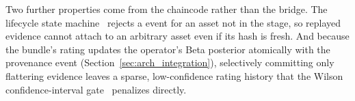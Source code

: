Two further properties come from the chaincode rather than the bridge.
The lifecycle state machine~\cite{anonymous2026unified} rejects a
 event for an asset not in the
 stage, so replayed evidence cannot attach to
an arbitrary asset even if its hash is fresh.  And because the bundle's
rating updates the operator's Beta posterior atomically with the
provenance event (Section~\ref{sec:arch_integration}), selectively
committing only flattering evidence leaves a sparse, low-confidence
rating history that the Wilson confidence-interval
gate~\cite{anonymous2026unified} penalizes directly.
